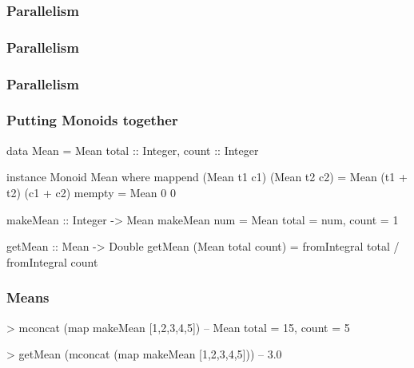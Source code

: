 \documentclass[UKenglish,usenames,dvipsnames,svgnames,table,aspectratio=169,mathserif]{beamer}
\begin{document}
\begin{frame}
\frametitle{Parallelism}
\begin{center}

\end{center}
\end{frame}
\begin{frame}
\frametitle{Parallelism}
\begin{center}

\end{center}
\end{frame}
\begin{frame}
\frametitle{Parallelism}
\begin{center}

\end{center}
\end{frame}



\begin{frame}[fragile]
\frametitle{Putting Monoids together}
\begin{center}
\begin{minipage}{0.6\textwidth}
\begin{haskellcode}
data Mean =
  Mean {
    total :: Integer,
    count :: Integer
  }
\end{haskellcode}
\pause

\begin{haskellcode}
instance Monoid Mean where
  mappend (Mean t1 c1) (Mean t2 c2) =
    Mean (t1 + t2) (c1 + c2)
  mempty =
    Mean 0 0
\end{haskellcode}
\pause

\begin{haskellcode}
makeMean :: Integer -> Mean
makeMean num = Mean { total = num, count = 1 }

getMean :: Mean -> Double
getMean (Mean total count) =
  fromIntegral total / fromIntegral count
\end{haskellcode}
\end{minipage}
\end{center}
\end{frame}


\begin{frame}[fragile]
\frametitle{Means}
\begin{center}
\begin{minipage}{0.6\textwidth}
\begin{haskellcode}
> mconcat (map makeMean [1,2,3,4,5])
-- Mean { total = 15, count = 5 }
\end{haskellcode}
\pause
\begin{haskellcode}
> getMean (mconcat (map makeMean [1,2,3,4,5]))
-- 3.0
\end{haskellcode}
\end{minipage}
\end{center}
\end{frame}
\end{document}

